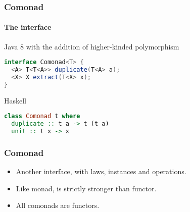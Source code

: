 \begin{frame}[fragile]
\frametitle{Comonad}
\framesubtitle{The interface}
\begin{block}{Java 8 with the addition of higher-kinded polymorphism}
\begin{lstlisting}[style=language,language=java]
interface Comonad<T> {
  <A> T<T<A>> duplicate(T<A> a);
  <X> X extract(T<X> x);
}
\end{lstlisting}
\end{block}
\begin{block}{Haskell}
\begin{lstlisting}[style=language,language=haskell]
class Comonad t where
  duplicate :: t a -> t (t a)
  unit :: t x -> x
\end{lstlisting}
\end{block}
\end{frame}

\begin{frame}[fragile]
\frametitle{Comonad}
\begin{itemize}
\item Another interface, with laws, instances and operations.
\item Like monad, is strictly stronger than functor.
\item All comonads are functors.
\end{itemize}
\end{frame}

